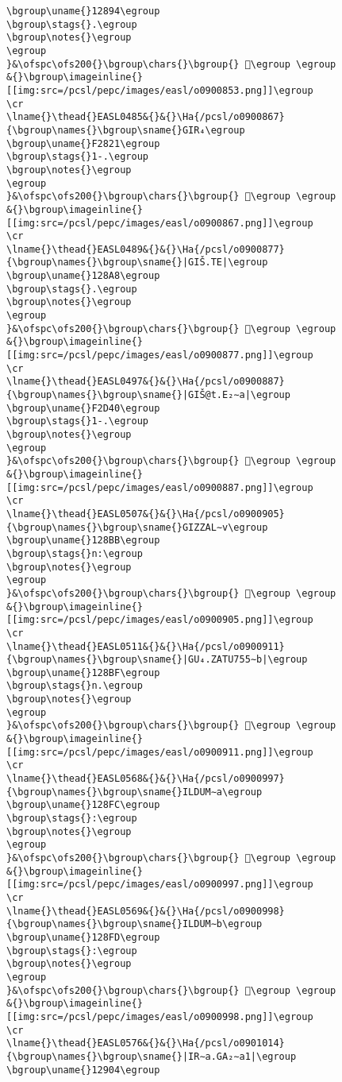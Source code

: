 \begin{verbatim}
\bgroup\uname{}12894\egroup
\bgroup\stags{}.\egroup
\bgroup\notes{}\egroup
\egroup
}&\ofspc\ofs200{}\bgroup\chars{}\bgroup{} 𒢔\egroup \egroup
&{}\bgroup\imageinline{}[[img:src=/pcsl/pepc/images/easl/o0900853.png]]\egroup
\cr
\lname{}\thead{}EASL0485&{}&{}\Ha{/pcsl/o0900867}{\bgroup\names{}\bgroup\sname{}GIR₄\egroup
\bgroup\uname{}F2821\egroup
\bgroup\stags{}1-.\egroup
\bgroup\notes{}\egroup
\egroup
}&\ofspc\ofs200{}\bgroup\chars{}\bgroup{} 󲠡\egroup \egroup
&{}\bgroup\imageinline{}[[img:src=/pcsl/pepc/images/easl/o0900867.png]]\egroup
\cr
\lname{}\thead{}EASL0489&{}&{}\Ha{/pcsl/o0900877}{\bgroup\names{}\bgroup\sname{}|GIŠ.TE|\egroup
\bgroup\uname{}128A8\egroup
\bgroup\stags{}.\egroup
\bgroup\notes{}\egroup
\egroup
}&\ofspc\ofs200{}\bgroup\chars{}\bgroup{} 𒢨\egroup \egroup
&{}\bgroup\imageinline{}[[img:src=/pcsl/pepc/images/easl/o0900877.png]]\egroup
\cr
\lname{}\thead{}EASL0497&{}&{}\Ha{/pcsl/o0900887}{\bgroup\names{}\bgroup\sname{}|GIŠ@t.E₂∼a|\egroup
\bgroup\uname{}F2D40\egroup
\bgroup\stags{}1-.\egroup
\bgroup\notes{}\egroup
\egroup
}&\ofspc\ofs200{}\bgroup\chars{}\bgroup{} 󲵀\egroup \egroup
&{}\bgroup\imageinline{}[[img:src=/pcsl/pepc/images/easl/o0900887.png]]\egroup
\cr
\lname{}\thead{}EASL0507&{}&{}\Ha{/pcsl/o0900905}{\bgroup\names{}\bgroup\sname{}GIZZAL∼v\egroup
\bgroup\uname{}128BB\egroup
\bgroup\stags{}n:\egroup
\bgroup\notes{}\egroup
\egroup
}&\ofspc\ofs200{}\bgroup\chars{}\bgroup{} 𒢻\egroup \egroup
&{}\bgroup\imageinline{}[[img:src=/pcsl/pepc/images/easl/o0900905.png]]\egroup
\cr
\lname{}\thead{}EASL0511&{}&{}\Ha{/pcsl/o0900911}{\bgroup\names{}\bgroup\sname{}|GU₄.ZATU755∼b|\egroup
\bgroup\uname{}128BF\egroup
\bgroup\stags{}n.\egroup
\bgroup\notes{}\egroup
\egroup
}&\ofspc\ofs200{}\bgroup\chars{}\bgroup{} 𒢿\egroup \egroup
&{}\bgroup\imageinline{}[[img:src=/pcsl/pepc/images/easl/o0900911.png]]\egroup
\cr
\lname{}\thead{}EASL0568&{}&{}\Ha{/pcsl/o0900997}{\bgroup\names{}\bgroup\sname{}ILDUM∼a\egroup
\bgroup\uname{}128FC\egroup
\bgroup\stags{}:\egroup
\bgroup\notes{}\egroup
\egroup
}&\ofspc\ofs200{}\bgroup\chars{}\bgroup{} 𒣼\egroup \egroup
&{}\bgroup\imageinline{}[[img:src=/pcsl/pepc/images/easl/o0900997.png]]\egroup
\cr
\lname{}\thead{}EASL0569&{}&{}\Ha{/pcsl/o0900998}{\bgroup\names{}\bgroup\sname{}ILDUM∼b\egroup
\bgroup\uname{}128FD\egroup
\bgroup\stags{}:\egroup
\bgroup\notes{}\egroup
\egroup
}&\ofspc\ofs200{}\bgroup\chars{}\bgroup{} 𒣽\egroup \egroup
&{}\bgroup\imageinline{}[[img:src=/pcsl/pepc/images/easl/o0900998.png]]\egroup
\cr
\lname{}\thead{}EASL0576&{}&{}\Ha{/pcsl/o0901014}{\bgroup\names{}\bgroup\sname{}|IR∼a.GA₂∼a1|\egroup
\bgroup\uname{}12904\egroup

\end{verbatim}
